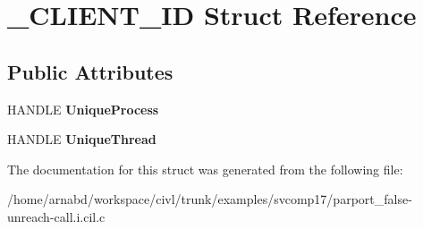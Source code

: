 \hypertarget{struct__CLIENT__ID}{}\section{\+\_\+\+C\+L\+I\+E\+N\+T\+\_\+\+I\+D Struct Reference}
\label{struct__CLIENT__ID}
\subsection*{Public Attributes}
\begin{DoxyCompactItemize}
\item 
\hypertarget{struct__CLIENT__ID_abb0a773960bff0abda53454fd7921a07}{}H\+A\+N\+D\+L\+E {\bfseries Unique\+Process}\label{struct__CLIENT__ID_abb0a773960bff0abda53454fd7921a07}

\item 
\hypertarget{struct__CLIENT__ID_a48899a44b4edcb3f44ccde218a33f35f}{}H\+A\+N\+D\+L\+E {\bfseries Unique\+Thread}\label{struct__CLIENT__ID_a48899a44b4edcb3f44ccde218a33f35f}

\end{DoxyCompactItemize}


The documentation for this struct was generated from the following file\+:\begin{DoxyCompactItemize}
\item 
/home/arnabd/workspace/civl/trunk/examples/svcomp17/parport\+\_\+false-\/unreach-\/call.\+i.\+cil.\+c\end{DoxyCompactItemize}
